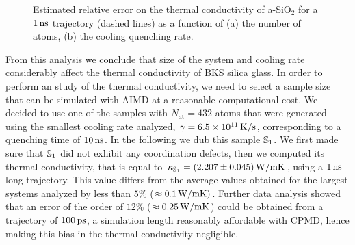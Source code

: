 \begin{figure}[!tb]
    \centering
    \hfill
    \caption{Estimated relative error on the thermal conductivity of a-SiO$_2$ for a $1\,\mathrm{ns}$ trajectory (dashed lines) as a function of (a) the number of atoms, (b) the cooling quenching rate. 
    }
    \label{fig:results-class-kappaerror}
\end{figure}

From this analysis we conclude that size of the system and cooling rate considerably affect the thermal conductivity of BKS silica glass. 
In order to perform an \abinitio study of the thermal conductivity, we need to select a sample size that can be simulated with AIMD at a reasonable computational cost. 
We decided to use one of the samples with $N_{\mathrm{at}}=432$ atoms that were generated using the smallest cooling rate analyzed, $\gamma=6.5\times 10^{11}\,\mathrm{K/s}$, corresponding to a quenching time of $10\,\mathrm{ns}$. In the following we dub this sample $\S1$. 
We first made sure that $\S1$ did not exhibit any coordination defects, then we computed its thermal conductivity, that is equal to $\kappa_\S1 = (2.207 \pm 0.045) \un{W/mK}$, using a $1\,\mathrm{ns}$-long trajectory. 
This value differs from the average values obtained for the largest systems analyzed by less than $5\%$ ($\approx 0.1\,\mathrm{W/mK})$. 
Further data analysis showed that an error of the order of $12\%$ ($\approx 0.25\,\mathrm{W/mK}$) could be obtained from a trajectory of $100\,\mathrm{ps}$, a simulation length reasonably affordable with CPMD, hence making this bias in the thermal conductivity negligible. 



